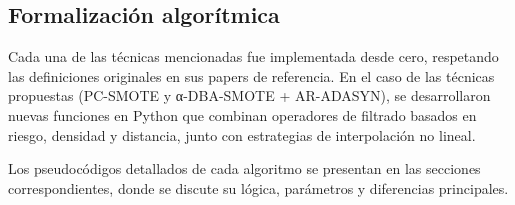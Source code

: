 \subsection{Formalización algorítmica}

Cada una de las técnicas mencionadas fue implementada desde cero, respetando las definiciones originales en sus papers de referencia. En el caso de las técnicas propuestas (PC-SMOTE y α-DBA-SMOTE + AR-ADASYN), se desarrollaron nuevas funciones en Python que combinan operadores de filtrado basados en riesgo, densidad y distancia, junto con estrategias de interpolación no lineal.

Los pseudocódigos detallados de cada algoritmo se presentan en las secciones correspondientes, donde se discute su lógica, parámetros y diferencias principales.
